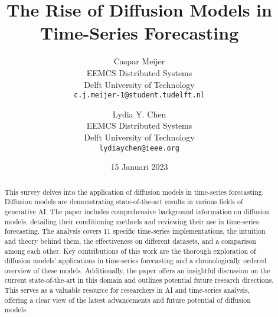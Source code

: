 \documentclass{article}
\title{The Rise of Diffusion Models in Time-Series Forecasting}
\author{Caspar Meijer \\
        EEMCS Distributed Systems \\
        Delft University of Technology \\
        \texttt{c.j.meijer-1@student.tudelft.nl} 
        \and
        Lydia Y. Chen \\
        EEMCS Distributed Systems \\
        Delft University of Technology \\
        \texttt{lydiaychen@ieee.org}}
\date{15 Januari 2023}
\begin{document}
\maketitle

\begin{abstract}
This survey delves into the application of diffusion models in time-series forecasting. Diffusion models are demonstrating state-of-the-art results in various fields of generative AI.
The paper includes comprehensive background information on diffusion models, detailing their conditioning methods and reviewing their use in time-series forecasting. The analysis covers 11 specific time-series implementations, the intuition and theory behind them, the effectiveness on different datasets, and a comparison among each other.
Key contributions of this work are the thorough exploration of diffusion models' applications in time-series forecasting and a chronologically ordered overview of these models. Additionally, the paper offers an insightful discussion on the current state-of-the-art in this domain and outlines potential future research directions. This serves as a valuable resource for researchers in AI and time-series analysis, offering a clear view of the latest advancements and future potential of diffusion models.
\end{abstract}


 \newpage




\printbibliography
\end{document}
